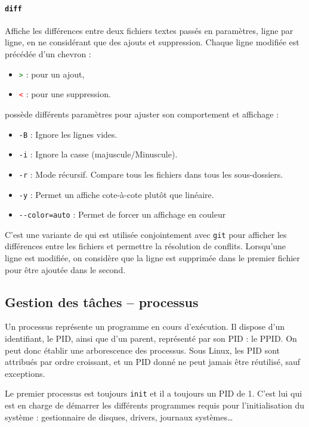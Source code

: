 \paragraph{\texttt{diff}} 
Affiche les différences entre deux fichiers textes passés en paramètres, ligne par ligne, en ne considérant que des ajouts et suppression. Chaque ligne modifiée est précédée d'un chevron :
\begin{itemize}
    \item \textcolor{green}{\texttt{>}} : pour un ajout,
    \item \textcolor{red}{\texttt{<}} : pour une suppression.
\end{itemize}
 possède différents paramètres pour ajuster son comportement et affichage :
\begin{itemize}
    \item \texttt{-B} : Ignore les lignes vides.
    \item \texttt{-i} : Ignore la casse (majuscule/Minuscule).
    \item \texttt{-r} : Mode récursif. Compare tous les fichiers dans tous les sous-dossiers.
    \item \texttt{-y} : Permet un affiche cote-à-cote plutôt que linéaire.
    \item \texttt{-{}-color=auto} : Permet de forcer un affichage en couleur
\end{itemize}

 C'est une variante de  qui est utilisée conjointement avec \texttt{git} pour afficher les différences entre les fichiers et permettre la résolution de conflits. Lorsqu'une ligne est modifiée, on considère que la ligne est supprimée dans le premier fichier pour être ajoutée dans le second.

\newpage

\subsection{Gestion des tâches -- processus}

Un processus représente un programme en cours d'exécution. Il dispose d'un identifiant, le PID, ainsi que d'un parent, représenté par son PID : le PPID. On peut donc établir une arborescence des processus.
Sous Linux, les PID sont attribués par ordre croissant, et un PID donné ne peut jamais être réutilisé, sauf exceptions.

Le premier processus est toujours \texttt{init} et il a toujours un PID de 1. C'est lui qui est en charge de démarrer les différents programmes requis pour l'initialisation du système : gestionnaire de disques, drivers, journaux systèmes\dots

